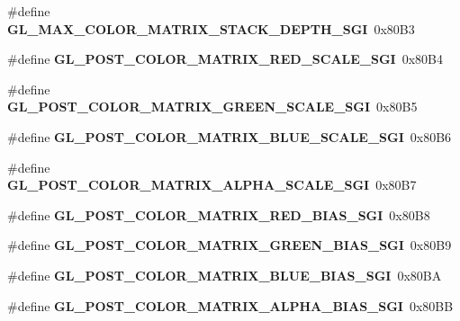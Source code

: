 \begin{DoxyCompactItemize}
\item 
\#define {\bfseries G\+L\+\_\+\+M\+A\+X\+\_\+\+C\+O\+L\+O\+R\+\_\+\+M\+A\+T\+R\+I\+X\+\_\+\+S\+T\+A\+C\+K\+\_\+\+D\+E\+P\+T\+H\+\_\+\+S\+G\+I}~0x80\+B3\label{_s_d_l__opengl_8h_ac2c9e03e7e211acbbea8ad938a15d866}

\item 
\#define {\bfseries G\+L\+\_\+\+P\+O\+S\+T\+\_\+\+C\+O\+L\+O\+R\+\_\+\+M\+A\+T\+R\+I\+X\+\_\+\+R\+E\+D\+\_\+\+S\+C\+A\+L\+E\+\_\+\+S\+G\+I}~0x80\+B4\label{_s_d_l__opengl_8h_a0f4c05beb3c5118279f68cc591d3df06}

\item 
\#define {\bfseries G\+L\+\_\+\+P\+O\+S\+T\+\_\+\+C\+O\+L\+O\+R\+\_\+\+M\+A\+T\+R\+I\+X\+\_\+\+G\+R\+E\+E\+N\+\_\+\+S\+C\+A\+L\+E\+\_\+\+S\+G\+I}~0x80\+B5\label{_s_d_l__opengl_8h_a77cfb9ce05b58d460ec1d394159ab2a1}

\item 
\#define {\bfseries G\+L\+\_\+\+P\+O\+S\+T\+\_\+\+C\+O\+L\+O\+R\+\_\+\+M\+A\+T\+R\+I\+X\+\_\+\+B\+L\+U\+E\+\_\+\+S\+C\+A\+L\+E\+\_\+\+S\+G\+I}~0x80\+B6\label{_s_d_l__opengl_8h_a93e0887d1967652796855a970cf2c39a}

\item 
\#define {\bfseries G\+L\+\_\+\+P\+O\+S\+T\+\_\+\+C\+O\+L\+O\+R\+\_\+\+M\+A\+T\+R\+I\+X\+\_\+\+A\+L\+P\+H\+A\+\_\+\+S\+C\+A\+L\+E\+\_\+\+S\+G\+I}~0x80\+B7\label{_s_d_l__opengl_8h_ad4ea1f440645882397344bd53847b067}

\item 
\#define {\bfseries G\+L\+\_\+\+P\+O\+S\+T\+\_\+\+C\+O\+L\+O\+R\+\_\+\+M\+A\+T\+R\+I\+X\+\_\+\+R\+E\+D\+\_\+\+B\+I\+A\+S\+\_\+\+S\+G\+I}~0x80\+B8\label{_s_d_l__opengl_8h_a4bb4f4cd3672735d79e38d3390bbe02e}

\item 
\#define {\bfseries G\+L\+\_\+\+P\+O\+S\+T\+\_\+\+C\+O\+L\+O\+R\+\_\+\+M\+A\+T\+R\+I\+X\+\_\+\+G\+R\+E\+E\+N\+\_\+\+B\+I\+A\+S\+\_\+\+S\+G\+I}~0x80\+B9\label{_s_d_l__opengl_8h_aed98fc9f7e99f5aff56ad811d8107670}

\item 
\#define {\bfseries G\+L\+\_\+\+P\+O\+S\+T\+\_\+\+C\+O\+L\+O\+R\+\_\+\+M\+A\+T\+R\+I\+X\+\_\+\+B\+L\+U\+E\+\_\+\+B\+I\+A\+S\+\_\+\+S\+G\+I}~0x80\+B\+A\label{_s_d_l__opengl_8h_a68df29b6719cc192d565a8576b8d79c8}

\item 
\#define {\bfseries G\+L\+\_\+\+P\+O\+S\+T\+\_\+\+C\+O\+L\+O\+R\+\_\+\+M\+A\+T\+R\+I\+X\+\_\+\+A\+L\+P\+H\+A\+\_\+\+B\+I\+A\+S\+\_\+\+S\+G\+I}~0x80\+B\+B\label{_s_d_l__opengl_8h_a40f82bccf843c6dba584841780f2bb34}


\end{DoxyCompactItemize}

